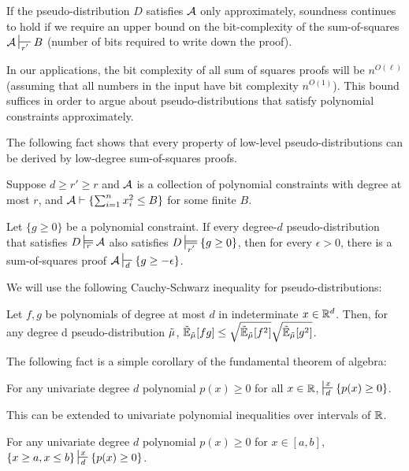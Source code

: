 If the pseudo-distribution $D$ satisfies $\mathcal A$ only approximately, soundness continues to hold if we require an upper bound on the bit-complexity of the sum-of-squares $\cA \sststile{r'}{} B$  (number of bits required to write down the proof).

In our applications, the bit complexity of all sum of squares proofs will be $n^{O(\ell)}$ (assuming that all numbers in the input have bit complexity $n^{O(1)}$).
This bound suffices in order to argue about pseudo-distributions that satisfy polynomial constraints approximately.

The following fact shows that every property of low-level pseudo-distributions can be derived by low-degree sum-of-squares proofs.

\begin{fact}[Completeness]
  \label{fact:sos-completeness}
  Suppose $d \geq r' \geq r$ and $\mathcal A$ is a collection of polynomial constraints with degree at most $r$, and $\mathcal A \vdash \{ \sum_{i = 1}^n x_i^2 \leq B\}$ for some finite $B$.

  Let $\{g \geq 0 \}$ be a polynomial constraint.
  If every degree-$d$ pseudo-distribution that satisfies $D \sdtstile{r}{} \cA$ also satisfies $D \sdtstile{r'}{} \{g \geq 0 \}$, then for every $\epsilon > 0$, there is a sum-of-squares proof $\cA \sststile{d}{} \{g \geq - \epsilon \}$.
\end{fact}

We will use the following Cauchy-Schwarz inequality for pseudo-distributions:

\begin{fact}
Let $f,g$ be polynomials of degree at most $d$ in indeterminate $x \in \mathbb R^d$. Then, for any degree d pseudo-distribution $\tilde{\mu}$,
$\operatorname{\tilde{\mathbb{E}}}_{\tilde{\mu}}[fg] \leq \sqrt{\operatorname{\tilde{\mathbb{E}}}_{\tilde{\mu}}[f^2]} \sqrt{\operatorname{\tilde{\mathbb{E}}}_{\tilde{\mu}}[g^2]}$.
 \label{fact:pseudo-expectation-cauchy-schwarz}
\end{fact} 

The following fact is a simple corollary of the fundamental theorem of algebra:
\begin{fact}
For any univariate degree $d$ polynomial $p(x) \geq 0$ for all $x \in \mathbb R$, 
$\sststile{d}{x} \Set{p(x) \geq 0}$.
 \label{fact:univariate}
\end{fact}

This can be extended to univariate polynomial inequalities over intervals of $\mathbb R$. 

\begin{fact}
For any univariate degree $d$ polynomial $p(x) \geq 0$ for $x \in [a, b]$,  $\Set{x\geq a, x \leq b} \sststile{d}{x} \Set{p(x) \geq 0}$.  \label{fact:univariate-interval}
\end{fact}


